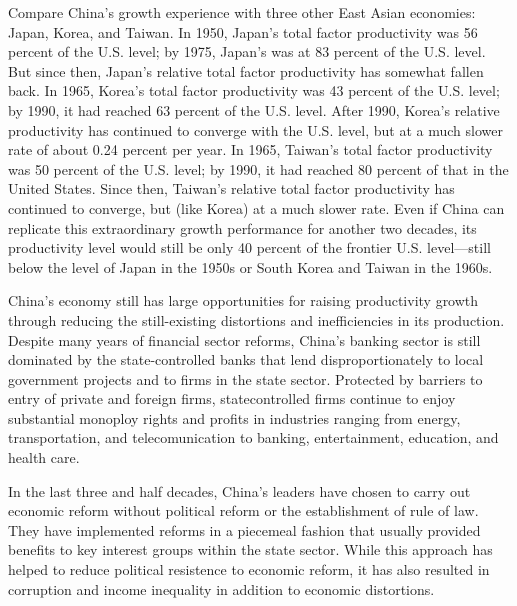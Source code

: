 \documentclass{article}
\begin{document}
    Compare China’s growth experience with three other East Asian economies: Japan, Korea, and Taiwan. In 1950, Japan’s total factor productivity was 56 percent of the U.S. level; by 1975, Japan’s was at 83 percent of the U.S. level. But since then, Japan’s relative total factor productivity has somewhat fallen back. In 1965, Korea’s total factor productivity was 43 percent of the U.S. level; by 1990, it had reached 63 percent of the U.S. level. After 1990, Korea’s relative productivity has continued to converge with the U.S. level, but at a much slower rate of about 0.24 percent per year. In 1965, Taiwan’s total factor productivity was 50 percent of the U.S. level; by 1990, it had reached 80 percent of that in the United States. Since then, Taiwan’s relative total factor productivity has continued to converge, but (like Korea) at a much slower rate. Even if China can replicate this extraordinary growth performance for another two decades, its productivity level would still be only 40 percent of the frontier U.S. level—still below the level of Japan in the 1950s or South Korea and Taiwan in the 1960s. 

    China’s economy still has large opportunities for raising productivity growth through reducing the still-existing distortions and inefficiencies in its production. Despite many years of financial sector reforms, China’s banking sector is still dominated by the state-controlled banks that lend disproportionately to local government projects and to firms in the state sector. Protected by barriers to entry of private and foreign firms, statecontrolled firms continue to enjoy substantial monoploy rights and profits in industries ranging from energy, transportation, and telecomunication to banking, entertainment, education, and health care. 

    In the last three and half decades, China’s leaders have chosen to carry out economic reform without political reform or the establishment of rule of law. They have implemented reforms in a piecemeal fashion that usually provided benefits to key interest groups within the state sector. While this approach has helped to reduce political resistence to economic reform, it has also resulted in corruption and income inequality in addition to economic distortions. 
\end{document}

